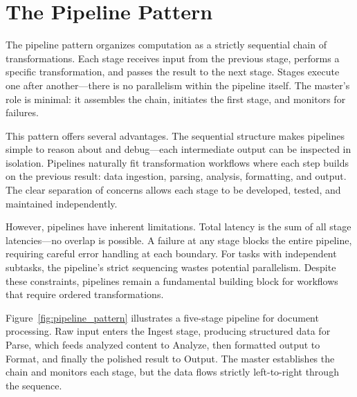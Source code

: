 
\section{The Pipeline Pattern}\label{sec:pipeline}

The pipeline pattern organizes computation as a strictly sequential chain of transformations.
Each stage receives input from the previous stage, performs a specific transformation, and passes the result to the next stage.
Stages execute one after another---there is no parallelism within the pipeline itself.
The master's role is minimal: it assembles the chain, initiates the first stage, and monitors for failures.

This pattern offers several advantages.
The sequential structure makes pipelines simple to reason about and debug---each intermediate output can be inspected in isolation.
Pipelines naturally fit transformation workflows where each step builds on the previous result: data ingestion, parsing, analysis, formatting, and output.
The clear separation of concerns allows each stage to be developed, tested, and maintained independently.

However, pipelines have inherent limitations.
Total latency is the sum of all stage latencies---no overlap is possible.
A failure at any stage blocks the entire pipeline, requiring careful error handling at each boundary.
For tasks with independent subtasks, the pipeline's strict sequencing wastes potential parallelism.
Despite these constraints, pipelines remain a fundamental building block for workflows that require ordered transformations.

Figure~\ref{fig:pipeline_pattern} illustrates a five-stage pipeline for document processing.
Raw input enters the Ingest stage, producing structured data for Parse, which feeds analyzed content to Analyze, then formatted output to Format, and finally the polished result to Output.
The master establishes the chain and monitors each stage, but the data flows strictly left-to-right through the sequence.

